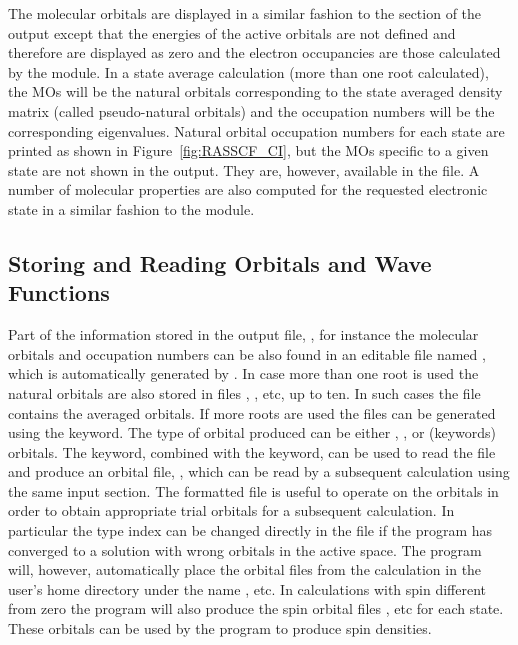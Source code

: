 The molecular orbitals are displayed in a similar fashion to the
 section of the output except that the energies of the
active orbitals are not defined and therefore are displayed as zero and
the electron occupancies are those calculated by the 
module. In a state average calculation (more than one root calculated),
the MOs will be the natural orbitals corresponding to the state
averaged density matrix (called pseudo-natural orbitals) and the occupation 
numbers will be the corresponding eigenvalues.  Natural orbital occupation 
numbers for each state are printed as shown in Figure~\ref{fig:RASSCF_CI}, but 
the MOs specific to a given state are not shown in the output.  They are,
however, available in the  file.  A number of molecular
properties are also computed for the requested electronic state in a similar 
fashion to the  module. 


\subsection{Storing and Reading  Orbitals and Wave Functions}
\label{TUT:sec:rasread}

Part of the information stored in the  output file, , 
for instance the molecular orbitals and occupation numbers can be also found
in an editable file named , which is automatically generated by 
. In case more than one root is used the natural orbitals are
also stored in files , , etc, up to ten. In such 
cases the file  contains the averaged orbitals. If more roots 
are used the files can be generated using the  keyword. 
The type of orbital produced can be either , 
,  or  (keywords) orbitals.  
The  keyword, combined with the  keyword,
can be used to read the  file and produce 
an orbital file, , which can be read by a subsequent
 calculation using the same input section.
The formatted  file is useful to operate on the orbitals in order
to obtain appropriate trial orbitals for a subsequent 
calculation. In particular the type index can be changed
directly in the file if the  program has converged to a solution 
with wrong orbitals in  the active space. The  program
will, however, automatically place the orbital files from the calculation in the
user's home directory under the name , etc. In 
calculations with spin different from zero the program will also produce the 
spin orbital files , etc for each state. These orbitals 
can be used by the program  to produce spin densities. 

